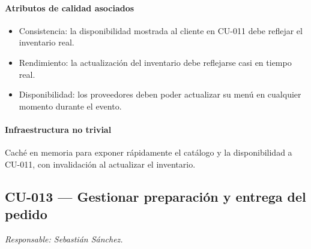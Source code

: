 \paragraph{Atributos de calidad asociados}
\begin{itemize}[leftmargin=1.4em, topsep=1pt]
  \item Consistencia: la disponibilidad mostrada al cliente en CU-011 debe reflejar el inventario real.
  \item Rendimiento: la actualización del inventario debe reflejarse casi en tiempo real.
  \item Disponibilidad: los proveedores deben poder actualizar su menú en cualquier momento durante el evento.
\end{itemize}

\paragraph{Infraestructura no trivial}
Caché en memoria para exponer rápidamente el catálogo y la disponibilidad a CU-011, con invalidación al actualizar el inventario.

\subsection{CU-013 --- Gestionar preparación y entrega del pedido}
\label{cu:cu-013}
\textit{Responsable: Sebastián Sánchez.}

